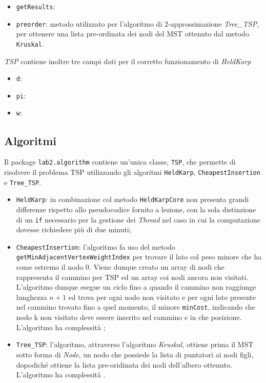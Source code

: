 \begin{itemize}
\begin{itemize}
		\item \texttt{getResults}:
		\item \texttt{preorder}: metodo utilizzato per l'algoritmo di 2-approssimazione \textit{Tree\_TSP}, per ottenere una lista pre-ordinata dei nodi del MST ottenuto dal metodo \texttt{Kruskal}.
	\end{itemize}
	\textit{TSP} contiene inoltre tre campi dati per il corretto funzionamento di \textit{HeldKarp}
	\begin{itemize}
		\item \texttt{d}:%
		\item \texttt{pi}:%
		\item \texttt{w}:%
	\end{itemize}
\end{itemize} 

\subsection{Algoritmi}
Il package \texttt{lab2.algorithm} contiene un'unica classe, \texttt{TSP}, che permette di risolvere il problema TSP utilizzando gli algoritmi \texttt{HeldKarp}, \texttt{CheapestInsertion} e \texttt{Tree\_TSP}.
\begin{itemize}
	\item \texttt{HeldKarp}: in combinazione col metodo \texttt{HeldKarpCore} non presenta grandi differenze rispetto allo pseudocodice fornito a lezione, con la sola distinzione di un \texttt{if} necessario per la gestione dei \textit{Thread} nel caso in cui la computazione dovesse richiedere più di due minuti;%
	\item \texttt{CheapestInsertion}: l'algoritmo fa uso del metodo \texttt{getMinAdjacentVertexWeightIndex} per trovare il lato col peso minore che ha come estremo il nodo 0. Viene dunque creato un array di nodi che rappresenta il cammino per TSP ed un array coi nodi ancora non visitati. L'algoritmo dunque esegue un ciclo fino a quando il cammino non raggiunge lunghezza $n+1$ ed trova per ogni nodo non visitato e per ogni lato presente nel cammino trovato fino a quel momento, il minore \texttt{minCost}, indicando che nodo k non visitato deve essere inserito nel cammino e in che posizione. L'algoritmo ha complessità ;
	\item \texttt{Tree\_TSP}: l'algoritmo, attraverso l'algoritmo \textit{Kruskal}, ottiene prima il MST sotto forma di \textit{Node}, un nodo che possiede la lista di puntatori ai nodi figli, dopodiché ottiene la lista pre-oridinata dei nodi dell'albero ottenuto. L'algoritmo ha complessità .
\end{itemize}

